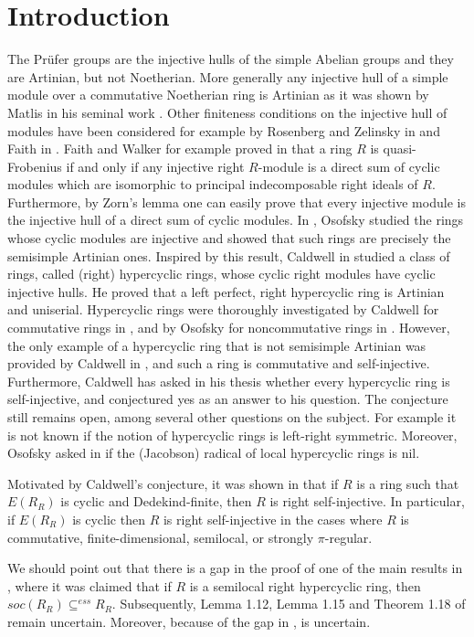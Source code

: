 \documentclass{amsart}
\theoremstyle{plain}
\numberwithin{equation}{section}
\begin{document}
\section{Introduction}
The Pr{\"u}fer groups are the injective hulls of the simple Abelian groups and they are Artinian, but not Noetherian.
More generally any injective hull of a simple module over a commutative Noetherian ring is Artinian as it was shown by Matlis in his seminal work \cite{M}.
Other finiteness conditions on the injective hull of modules have been considered for example by Rosenberg and Zelinsky in \cite{RZ} and Faith in \cite{Faith}. Faith and Walker for example proved in \cite[Theorem 5.5]{FW}
that a ring $R$ is quasi-Frobenius if and only if any injective right $R$-module is a direct sum of cyclic modules which are isomorphic to principal indecomposable right ideals of $R$. Furthermore, by Zorn's lemma one can easily prove that every injective module is the injective hull of a direct sum of cyclic modules.
In \cite{O2}, Osofsky studied the rings whose cyclic modules are injective
and showed that such rings are precisely the semisimple Artinian ones. Inspired by this result, Caldwell in \cite{C}
studied a class of rings, called (right)  {hypercyclic rings}, whose cyclic right modules have cyclic injective hulls. He proved that
a left perfect, right hypercyclic ring is Artinian and uniserial. Hypercyclic rings were thoroughly investigated by Caldwell for commutative rings in \cite{C}, and by Osofsky for noncommutative rings in \cite{O1}.
However, the only example of a hypercyclic ring that is not semisimple Artinian was provided by Caldwell in \cite{C},
and such a ring is commutative and self-injective. Furthermore, Caldwell has asked in his thesis \cite[Page 53]{C 1}
whether every hypercyclic ring is self-injective, and conjectured yes as an answer to his question. The conjecture still remains open, among several other
questions on the subject. For example it is not known if the notion of hypercyclic rings is left-right symmetric. Moreover, Osofsky asked in \cite{O1}
if the (Jacobson) radical of local hypercyclic rings is nil. 

Motivated by Caldwell's conjecture, it was shown in \cite{IY 5}
that if $R$ is a ring such that $E (R_{R})$ is cyclic and Dedekind-finite, then $R$ is right self-injective. In particular, if $E (R_{R})$ is cyclic then $R$ is right self-injective in the cases where $R$ is commutative, finite-dimensional, semilocal, or strongly $\pi $-regular. 

\bigskip We should point out that there is a gap in the proof of one of the
main results in \cite[Proposition 1.6]{O1},
where it was claimed that if $R$ is a semilocal right hypercyclic ring, then $s o c (R_{R})  \subseteq ^{e s s}R_{R}$. Subsequently, Lemma 1.12, Lemma 1.15 and Theorem 1.18 of \cite{O1}
remain uncertain. Moreover, because of the gap in \cite[Proposition 1.6]{O1},
\cite[Theorem 3.4]{JS}
is uncertain. 
\end{document}
